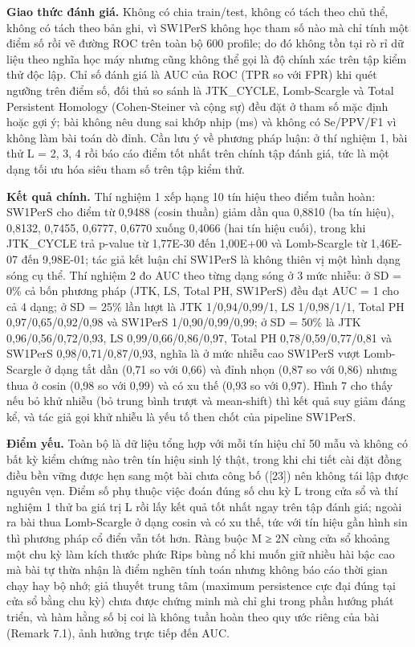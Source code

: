 \documentclass[12pt,a4paper]{article}
\begin{document}
\noindent \textbf{Giao thức đánh giá.} Không có chia train/test, không có tách theo chủ thể, không có tách theo bản ghi, vì SW1PerS không học tham số nào mà chỉ tính một điểm số rồi vẽ đường ROC trên toàn bộ 600 profile; do đó không tồn tại rò rỉ dữ liệu theo nghĩa học máy nhưng cũng không thể gọi là độ chính xác trên tập kiểm thử độc lập. Chỉ số đánh giá là AUC của ROC (TPR so với FPR) khi quét ngưỡng trên điểm số, đối thủ so sánh là JTK\_CYCLE, Lomb-Scargle và Total Persistent Homology (Cohen-Steiner và cộng sự) đều đặt ở tham số mặc định hoặc gợi ý; bài không nêu dung sai khớp nhịp (ms) và không có Se/PPV/F1 vì không làm bài toán dò đỉnh. Cần lưu ý về phương pháp luận: ở thí nghiệm 1, bài thử L = 2, 3, 4 rồi báo cáo điểm tốt nhất trên chính tập đánh giá, tức là một dạng tối ưu hóa siêu tham số trên tập kiểm thử.\par\vspace{3pt}
\noindent \textbf{Kết quả chính.} Thí nghiệm 1 xếp hạng 10 tín hiệu theo điểm tuần hoàn: SW1PerS cho điểm từ 0,9488 (cosin thuần) giảm dần qua 0,8810 (ba tín hiệu), 0,8132, 0,7455, 0,6777, 0,6770 xuống 0,4066 (hai tín hiệu cuối), trong khi JTK\_CYCLE trả p-value từ 1,77E-30 đến 1,00E+00 và Lomb-Scargle từ 1,46E-07 đến 9,98E-01; tác giả kết luận chỉ SW1PerS là không thiên vị một hình dạng sóng cụ thể. Thí nghiệm 2 đo AUC theo từng dạng sóng ở 3 mức nhiễu: ở SD = 0\% cả bốn phương pháp (JTK, LS, Total PH, SW1PerS) đều đạt AUC = 1 cho cả 4 dạng; ở SD = 25\% lần lượt là JTK 1/0,94/0,99/1, LS 1/0,98/1/1, Total PH 0,97/0,65/0,92/0,98 và SW1PerS 1/0,90/0,99/0,99; ở SD = 50\% là JTK 0,96/0,56/0,72/0,93, LS 0,99/0,66/0,86/0,97, Total PH 0,78/0,59/0,77/0,81 và SW1PerS 0,98/0,71/0,87/0,93, nghĩa là ở mức nhiễu cao SW1PerS vượt Lomb-Scargle ở dạng tắt dần (0,71 so với 0,66) và đỉnh nhọn (0,87 so với 0,86) nhưng thua ở cosin (0,98 so với 0,99) và có xu thế (0,93 so với 0,97). Hình 7 cho thấy nếu bỏ khử nhiễu (bỏ trung bình trượt và mean-shift) thì kết quả suy giảm đáng kể, và tác giả gọi khử nhiễu là yếu tố then chốt của pipeline SW1PerS.\par\vspace{3pt}
\noindent \textbf{Điểm yếu.} Toàn bộ là dữ liệu tổng hợp với mỗi tín hiệu chỉ 50 mẫu và không có bất kỳ kiểm chứng nào trên tín hiệu sinh lý thật, trong khi chi tiết cài đặt đồng điều bền vững được hẹn sang một bài chưa công bố ([23]) nên không tái lập được nguyên vẹn. Điểm số phụ thuộc việc đoán đúng số chu kỳ L trong cửa sổ và thí nghiệm 1 thử ba giá trị L rồi lấy kết quả tốt nhất ngay trên tập đánh giá; ngoài ra bài thua Lomb-Scargle ở dạng cosin và có xu thế, tức với tín hiệu gần hình sin thì phương pháp cổ điển vẫn tốt hơn. Ràng buộc M ≥ 2N cùng cửa sổ khoảng một chu kỳ làm kích thước phức Rips bùng nổ khi muốn giữ nhiều hài bậc cao mà bài tự thừa nhận là điểm nghẽn tính toán nhưng không báo cáo thời gian chạy hay bộ nhớ; giả thuyết trung tâm (maximum persistence cực đại đúng tại cửa sổ bằng chu kỳ) chưa được chứng minh mà chỉ ghi trong phần hướng phát triển, và hàm hằng số bị coi là không tuần hoàn theo quy ước riêng của bài (Remark 7.1), ảnh hưởng trực tiếp đến AUC.\par\vspace{3pt}
\end{document}
